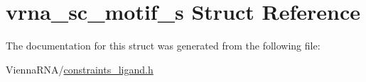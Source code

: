 \hypertarget{structvrna__sc__motif__s}{}\section{vrna\+\_\+sc\+\_\+motif\+\_\+s Struct Reference}
\label{structvrna__sc__motif__s}


The documentation for this struct was generated from the following file\+:\begin{DoxyCompactItemize}
\item 
Vienna\+R\+N\+A/\hyperlink{constraints__ligand_8h}{constraints\+\_\+ligand.\+h}\end{DoxyCompactItemize}
